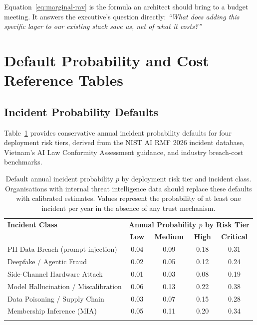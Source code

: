 Equation~\eqref{eq:marginal-rav} is the formula an architect
should bring to a budget meeting.
It answers the executive's question directly:
\emph{``What does adding this specific layer to our existing
stack save us, net of what it costs?''}

\section{Default Probability and Cost Reference Tables}
\label{sec:default-tables}

\subsection{Incident Probability Defaults}
\label{subsec:default-probabilities}

Table~\ref{tab:default-probabilities} provides conservative
annual incident probability defaults for four deployment
risk tiers, derived from the NIST AI RMF 2026 incident
database, Vietnam's AI Law Conformity Assessment guidance,
and industry breach-cost benchmarks.

\begin{table}[ht]
\centering
\caption{Default annual incident probability $p$ by deployment
  risk tier and incident class.
  Organisations with internal threat intelligence data should
  replace these defaults with calibrated estimates.
  Values represent the probability of at least one incident
  per year in the absence of any trust mechanism.}
\label{tab:default-probabilities}
\small
\begin{tabular}{p{4.5cm}cccc}
\hline\noalign{\smallskip}
\textbf{Incident Class}
  & \multicolumn{4}{c}{\textbf{Annual Probability $p$ by Risk Tier}} \\
\noalign{\smallskip}\svhline\noalign{\smallskip}
  & \textbf{Low} & \textbf{Medium} & \textbf{High}
  & \textbf{Critical} \\
\noalign{\smallskip}\hline\noalign{\smallskip}
PII Data Breach (prompt injection)
  & 0.04 & 0.09 & 0.18 & 0.31 \\
Deepfake / Agentic Fraud
  & 0.02 & 0.05 & 0.12 & 0.24 \\
Side-Channel Hardware Attack
  & 0.01 & 0.03 & 0.08 & 0.19 \\
Model Hallucination / Miscalibration
  & 0.06 & 0.13 & 0.22 & 0.38 \\
Data Poisoning / Supply Chain
  & 0.03 & 0.07 & 0.15 & 0.28 \\
Membership Inference (MIA)
  & 0.05 & 0.11 & 0.20 & 0.34 \\
\noalign{\smallskip}\hline\noalign{\smallskip}
\end{tabular}
\end{table}

